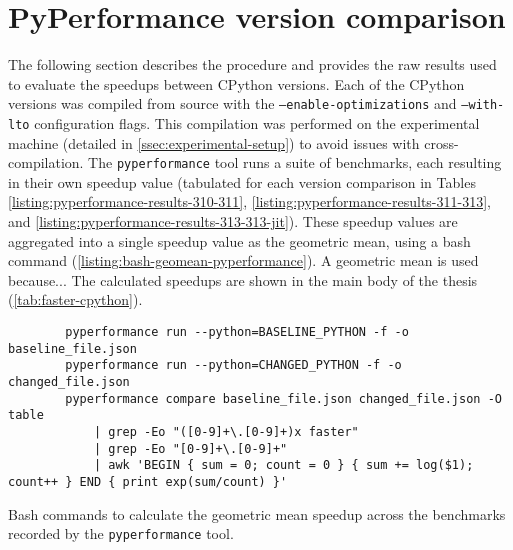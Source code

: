 \chapter{PyPerformance version comparison}
\label{chap:pyperformance-version-comparison}

The following section describes the procedure and provides the raw results used to evaluate the speedups between CPython versions.
Each of the CPython versions was compiled from source with the \texttt{--enable-optimizations} and \texttt{--with-lto} configuration flags. This compilation was performed on the experimental machine (detailed in \autoref{ssec:experimental-setup}) to avoid issues with cross-compilation.
The \texttt{pyperformance} tool runs a suite of benchmarks, each resulting in their own speedup value (tabulated for each version comparison in Tables \ref{listing:pyperformance-results-310-311}, \ref{listing:pyperformance-results-311-313}, and \ref{listing:pyperformance-results-313-313-jit}). These speedup values are aggregated into a single speedup value as the geometric mean, using a bash command (\autoref{listing:bash-geomean-pyperformance}).
A geometric mean is used because... %
The calculated speedups are shown in the main body of the thesis (\autoref{tab:faster-cpython}).

\vspace{2em}

\begin{code}
    \begin{verbatim}
        pyperformance run --python=BASELINE_PYTHON -f -o baseline_file.json
        pyperformance run --python=CHANGED_PYTHON -f -o changed_file.json
        pyperformance compare baseline_file.json changed_file.json -O table
            | grep -Eo "([0-9]+\.[0-9]+)x faster"
            | grep -Eo "[0-9]+\.[0-9]+"
            | awk 'BEGIN { sum = 0; count = 0 } { sum += log($1); count++ } END { print exp(sum/count) }'
    \end{verbatim}
    \caption{Bash commands to calculate the geometric mean speedup across the benchmarks recorded by the \texttt{pyperformance} tool.}
    \label{listing:bash-geomean-pyperformance}
\end{code}

\vspace{2em}

